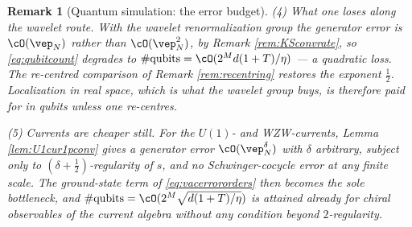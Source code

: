 \documentclass[a4paper, 11pt]{article}
\DeclareMathOperator{\1}{\mathds{1}}
\newtheorem{rem}[thm]{Remark}
\begin{document}
\begin{rem}[Quantum simulation: the error budget]
\emph{(4) What one loses along the wavelet route.} With the wavelet renormalization group the generator error is $\cO(\vep_{N})$ rather than $\cO(\vep_{N}^{2})$, by Remark \ref{rem:KSconvrate}, so \eqref{eq:qubitcount} degrades to $\#\textup{qubits}=\cO(2^{M}d(1+T)/\eta)$ --- a \emph{quadratic} loss. The re-centred comparison of Remark \ref{rem:recentring} restores the exponent $\tfrac{1}{2}$. Localization in real space, which is what the wavelet group buys, is therefore paid for in qubits unless one re-centres.

\emph{(5) Currents are cheaper still.} For the $U(1)$- and WZW-currents, Lemma \ref{lem:U1cur1pconv} gives a generator error $\cO(\vep_{N}^{\delta})$ with $\delta$ \emph{arbitrary}, subject only to $(\delta+\tfrac{1}{2})$-regularity of $s$, and no Schwinger-cocycle error at any finite scale. The ground-state term of \eqref{eq:vacerrororders} then becomes the sole bottleneck, and $\#\textup{qubits}=\cO(2^{M}\sqrt{d(1+T)/\eta})$ is attained already for chiral observables of the current algebra without any condition beyond $2$-regularity.
\end{rem}
\end{document}

